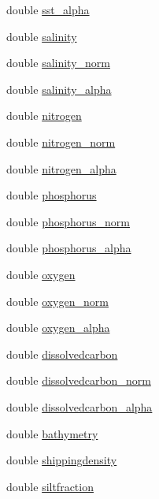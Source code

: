 \begin{DoxyCompactItemize}
\item 
double \mbox{\hyperlink{struct_environment_data_record_a15703750735fff780193af65ddd2c72e}{sst\+\_\+alpha}}
\item 
double \mbox{\hyperlink{struct_environment_data_record_a636a04fa23b31907bde979c0e768223a}{salinity}}
\item 
double \mbox{\hyperlink{struct_environment_data_record_ac7f2f0279f91e3df000df70179c44b8b}{salinity\+\_\+norm}}
\item 
double \mbox{\hyperlink{struct_environment_data_record_a38cd2909d0558beb4908a01d415350b1}{salinity\+\_\+alpha}}
\item 
double \mbox{\hyperlink{struct_environment_data_record_a6922e124eb8d290826a173cb01168f05}{nitrogen}}
\item 
double \mbox{\hyperlink{struct_environment_data_record_a71fa8d36d1f2f2373b929d7b2ca73d25}{nitrogen\+\_\+norm}}
\item 
double \mbox{\hyperlink{struct_environment_data_record_a08a106e054021cdd12e114a089896c4b}{nitrogen\+\_\+alpha}}
\item 
double \mbox{\hyperlink{struct_environment_data_record_a5692ae7828038350ee68fd8c754442be}{phosphorus}}
\item 
double \mbox{\hyperlink{struct_environment_data_record_a0bc1f2a33687b9a31e805cdb9ac80183}{phosphorus\+\_\+norm}}
\item 
double \mbox{\hyperlink{struct_environment_data_record_a28da285c820bd55a0ccb7e277723dc14}{phosphorus\+\_\+alpha}}
\item 
double \mbox{\hyperlink{struct_environment_data_record_a5d2c4b60c7ee406ea97263d9f80a27b4}{oxygen}}
\item 
double \mbox{\hyperlink{struct_environment_data_record_a01c56d214ae2787ca874a53df4f82777}{oxygen\+\_\+norm}}
\item 
double \mbox{\hyperlink{struct_environment_data_record_abe3fd6102dd0a851d58433a6e803226c}{oxygen\+\_\+alpha}}
\item 
double \mbox{\hyperlink{struct_environment_data_record_a1abc950708c4171109c8a342d68ee578}{dissolvedcarbon}}
\item 
double \mbox{\hyperlink{struct_environment_data_record_a2619c9070b52dbd53e4d2220cd547f63}{dissolvedcarbon\+\_\+norm}}
\item 
double \mbox{\hyperlink{struct_environment_data_record_a56034793dcd294d4553507e53b8402da}{dissolvedcarbon\+\_\+alpha}}
\item 
double \mbox{\hyperlink{struct_environment_data_record_a50b39c019ad73f9a6a1ab2dca3fa9bb7}{bathymetry}}
\item 
double \mbox{\hyperlink{struct_environment_data_record_abe44320264c80be920619e4ad6b0d0ed}{shippingdensity}}
\item 
double \mbox{\hyperlink{struct_environment_data_record_acb787291a2068c0ed2b4e7c807a6e7dd}{siltfraction}}
\end{DoxyCompactItemize}


